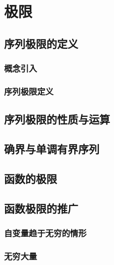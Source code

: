

\chapter{极\emspace 限}\label{ch:2}
\section{序列极限的定义}
\subsection{概念引入}
\subsection{序列极限定义}
\begin{exercise}
\item
\end{exercise}
\section{序列极限的性质与运算}
\begin{exercise}
\item
\end{exercise}
\section{确界与单调有界序列}
\begin{exercise}
\item
\end{exercise}
\section{函数的极限}
\begin{exercise}
\item
\end{exercise}
\section{函数极限的推广}
\subsection{自变量趋于无穷的情形}
\subsection{无穷大量}
